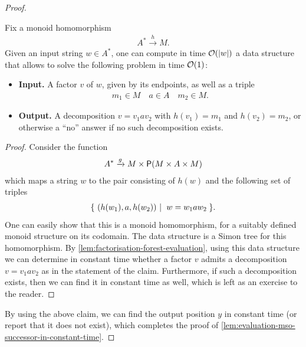 \begin{proof}
\begin{claim}\label{claim:find-position-in-factor}
    Fix a monoid homomorphism 
    \begin{align*}
    A^* \xrightarrow h M.
    \end{align*}
     Given an input string $w \in A^*$, one can compute in time ${\mathcal O}(|w|)$ a data structure that allows to solve the following  problem in time ${\mathcal O}(1)$:
    \begin{itemize}
    \item \textbf{Input.} A factor $v$ of $w$, given by its endpoints, as well as a triple
    \begin{align*}
    m_1 \in M \quad a \in A \quad m_2 \in M.
    \end{align*}
    \item \textbf{Output.} A decomposition $v = v_1 a v_2$ with $h(v_1)=m_1$ and $h(v_2)=m_2$, or otherwise a ``no'' answer if no such decomposition exists.
\end{itemize} 
\end{claim}
\begin{proof}
    Consider the function 
    \begin{align*}
    A^* \xrightarrow {g} M \times \mathsf{P}(M \times A \times M)
    \end{align*}
    which maps a string $w$ to the pair consisting of $h(w)$ and the following set of triples
    \begin{align*}
    \setbuild{(h(w_1),a,h(w_2))}{$w = w_1 a w_2$}.
    \end{align*}
    One can easily show that this is a monoid homomorphism, for a suitably defined monoid structure on its codomain. The data structure is a Simon tree for this homomorphism. By  \cref{lem:factorisation-forest-evaluation}, using this data structure we can determine in constant time whether a factor $v$ admits a decomposition $v = v_1 a v_2$ as in the statement of the claim. Furthermore, if such a decomposition exists, then we can find it in constant time as well, which is left as an exercise to the reader. 
\end{proof}
By using the above claim, we can find the output position $y$ in constant time (or report that it does not exist), which completes the proof of \cref{lem:evaluation-mso-successor-in-constant-time}.
\end{proof}


\exerciseheader

